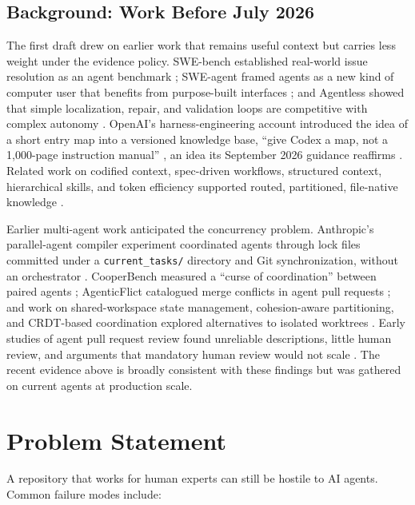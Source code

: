 \documentclass[11pt]{article}
\begin{document}
\subsection{Background: Work Before July 2026}
\label{sec:background}
The first draft drew on earlier work that remains useful context but carries less weight under the evidence policy. SWE-bench established real-world issue resolution as an agent benchmark \cite{jimenez2023swebench}; SWE-agent framed agents as a new kind of computer user that benefits from purpose-built interfaces \cite{yang2024sweagent}; and Agentless showed that simple localization, repair, and validation loops are competitive with complex autonomy \cite{xia2024agentless}. OpenAI's harness-engineering account introduced the idea of a short entry map into a versioned knowledge base, ``give Codex a map, not a 1,000-page instruction manual'' \cite{lopopolo2026harness}, an idea its September 2026 guidance reaffirms \cite{provencher2026astra}. Related work on codified context, spec-driven workflows, structured context, hierarchical skills, and token efficiency supported routed, partitioned, file-native knowledge \cite{vasilopoulos2026codified,taghavi2026speckit,mcmillan2026structured,sun2026corpus2skill,chen2026cuaskill,li2026singleagent,salim2026tokenomics,wang2026swepruner,voltagent2026awesome}.

Earlier multi-agent work anticipated the concurrency problem. Anthropic's parallel-agent compiler experiment coordinated agents through lock files committed under a \texttt{current\_tasks/} directory and Git synchronization, without an orchestrator \cite{carlini2026compiler}. CooperBench measured a ``curse of coordination'' between paired agents \cite{khatua2026cooperbench}; AgenticFlict catalogued merge conflicts in agent pull requests \cite{ogenrwot2026agenticflict}; and work on shared-workspace state management, cohesion-aware partitioning, and CRDT-based coordination explored alternatives to isolated worktrees \cite{liu2026storm,yang2026cocoder,pugachev2025codecrdt}. Early studies of agent pull request review found unreliable descriptions, little human review, and arguments that mandatory human review would not scale \cite{gong2026mci,duma2026reviews,monperrus2026endreview}. The recent evidence above is broadly consistent with these findings but was gathered on current agents at production scale.

\section{Problem Statement}
A repository that works for human experts can still be hostile to AI agents. Common failure modes include:
\end{document}
